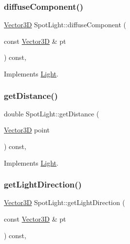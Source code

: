 \subsubsection{\texorpdfstring{diffuseComponent()}{diffuseComponent()}}
{\footnotesize\ttfamily \mbox{\hyperlink{classVector3D}{Vector3D}} Spot\+Light\+::diffuse\+Component (\begin{DoxyParamCaption}\item[{const \mbox{\hyperlink{classVector3D}{Vector3D}} \&}]{pt }\end{DoxyParamCaption}) const\hspace{0.3cm}{\ttfamily [override]}, {\ttfamily [virtual]}}



Implements \mbox{\hyperlink{classLight_af5dc859ada149ca54ec5088e1c33deb4}{Light}}.

\mbox{\label{classSpotLight_a117f7918773e193f67714765c5370418}} 
\subsubsection{\texorpdfstring{getDistance()}{getDistance()}}
{\footnotesize\ttfamily double Spot\+Light\+::get\+Distance (\begin{DoxyParamCaption}\item[{\mbox{\hyperlink{classVector3D}{Vector3D}}}]{point }\end{DoxyParamCaption}) const\hspace{0.3cm}{\ttfamily [override]}, {\ttfamily [virtual]}}



Implements \mbox{\hyperlink{classLight_a4a7a5a9d4fc67da122c3ce75f6075093}{Light}}.

\mbox{\label{classSpotLight_a051e210b637edf37bf2b8d49149a13a4}} 
\subsubsection{\texorpdfstring{getLightDirection()}{getLightDirection()}}
{\footnotesize\ttfamily \mbox{\hyperlink{classVector3D}{Vector3D}} Spot\+Light\+::get\+Light\+Direction (\begin{DoxyParamCaption}\item[{const \mbox{\hyperlink{classVector3D}{Vector3D}} \&}]{pt }\end{DoxyParamCaption}) const\hspace{0.3cm}{\ttfamily [override]}, {\ttfamily [virtual]}}



